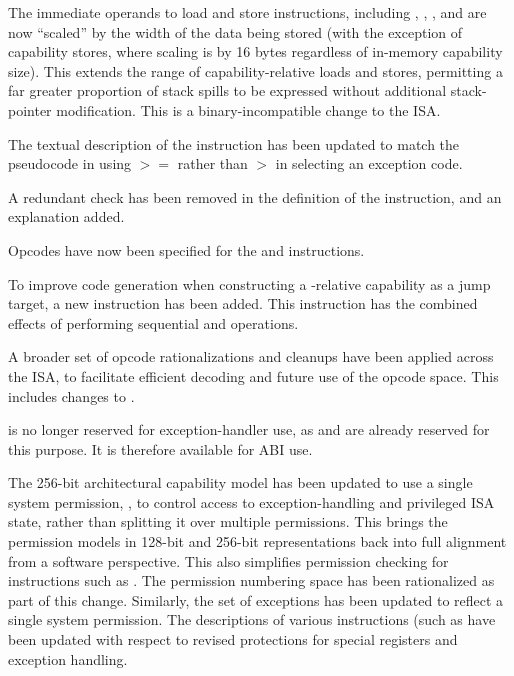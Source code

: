 \begin{description}
  The immediate operands to load and store instructions, including
  , , , and
   are now ``scaled'' by the width of the data being
  stored (with the exception of capability stores, where scaling is by 16
  bytes regardless of in-memory capability size).
  This extends the range of capability-relative loads and stores, permitting
  a far greater proportion of stack spills to be expressed without additional
  stack-pointer modification.
  This is a binary-incompatible change to the ISA.

  The textual description of the  instruction has been
  updated to match the pseudocode in using $>=$ rather than $>$ in selecting
  an exception code.

  A redundant check has been removed in the definition of the
   instruction, and an explanation added.

  Opcodes have now been specified for the  and
   instructions.

  To improve code generation when constructing a \PCC{}-relative capability as
  a jump target, a new  instruction has been
  added.
  This instruction has the combined effects of performing sequential
   and  operations.

  A broader set of opcode rationalizations and cleanups have been applied
  across the ISA, to facilitate efficient decoding and future use of the
  opcode space.
  This includes changes to .

   is no longer reserved for exception-handler use, as  and
   are already reserved for this purpose.
  It is therefore available for ABI use.

  The 256-bit architectural capability model has been updated to use a single
  system permission, \cappermASR, to control access to
  exception-handling and privileged ISA state, rather than splitting it over
  multiple permissions.
  This brings the permission models in 128-bit and 256-bit representations
  back into full alignment from a software perspective.
  This also simplifies permission checking for instructions such as
  .
  The permission numbering space has been rationalized as part of this change.
  Similarly, the set of exceptions has been updated to reflect a single system
  permission.
  The descriptions of various instructions (such as 
  have been updated with respect to revised protections for special registers
  and exception handling.


\end{description}
